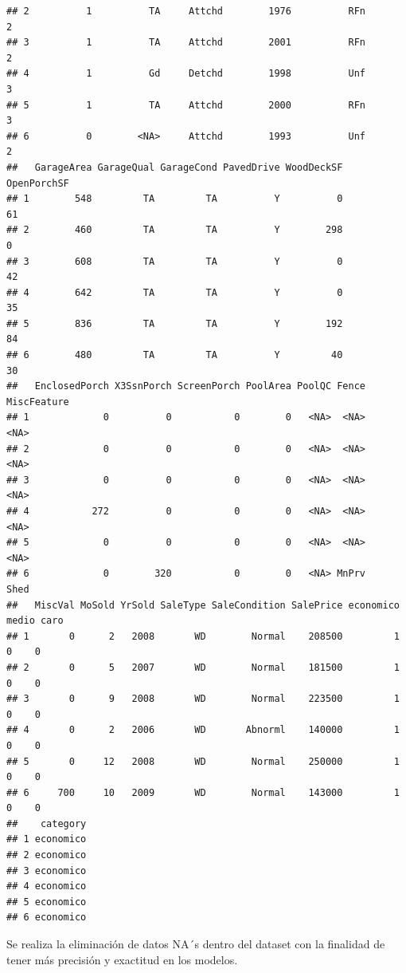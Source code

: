 \documentclass[
]{article}
\begin{document}
\begin{verbatim}
## 2          1          TA     Attchd        1976          RFn          2
## 3          1          TA     Attchd        2001          RFn          2
## 4          1          Gd     Detchd        1998          Unf          3
## 5          1          TA     Attchd        2000          RFn          3
## 6          0        <NA>     Attchd        1993          Unf          2
##   GarageArea GarageQual GarageCond PavedDrive WoodDeckSF OpenPorchSF
## 1        548         TA         TA          Y          0          61
## 2        460         TA         TA          Y        298           0
## 3        608         TA         TA          Y          0          42
## 4        642         TA         TA          Y          0          35
## 5        836         TA         TA          Y        192          84
## 6        480         TA         TA          Y         40          30
##   EnclosedPorch X3SsnPorch ScreenPorch PoolArea PoolQC Fence MiscFeature
## 1             0          0           0        0   <NA>  <NA>        <NA>
## 2             0          0           0        0   <NA>  <NA>        <NA>
## 3             0          0           0        0   <NA>  <NA>        <NA>
## 4           272          0           0        0   <NA>  <NA>        <NA>
## 5             0          0           0        0   <NA>  <NA>        <NA>
## 6             0        320           0        0   <NA> MnPrv        Shed
##   MiscVal MoSold YrSold SaleType SaleCondition SalePrice economico medio caro
## 1       0      2   2008       WD        Normal    208500         1     0    0
## 2       0      5   2007       WD        Normal    181500         1     0    0
## 3       0      9   2008       WD        Normal    223500         1     0    0
## 4       0      2   2006       WD       Abnorml    140000         1     0    0
## 5       0     12   2008       WD        Normal    250000         1     0    0
## 6     700     10   2009       WD        Normal    143000         1     0    0
##    category
## 1 economico
## 2 economico
## 3 economico
## 4 economico
## 5 economico
## 6 economico
\end{verbatim}

Se realiza la eliminación de datos NA´s dentro del dataset con la
finalidad de tener más precisión y exactitud en los modelos.
\end{document}
